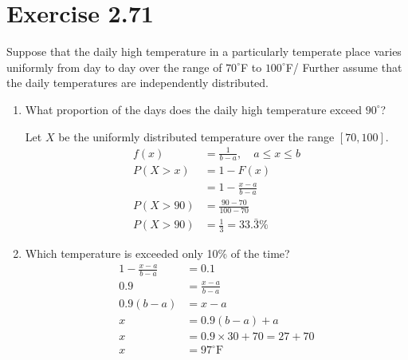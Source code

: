 \documentclass{article}
\begin{document}
\section*{Exercise 2.71}
Suppose that the daily high temperature in a particularly temperate place varies uniformly from day to day over the range of $70^\circ$F to $100^\circ$F/ Further assume that the daily temperatures are independently distributed.
\begin{enumerate}[\quad(a)]
	\item What proportion of the days does the daily high temperature exceed $90^\circ$?
	
	Let $X$ be the uniformly distributed temperature over the range $[70,100]$.
	\begin{align*}
		f(x) &= \frac{1}{b-a},\quad a\leq x \leq b\\
		P(X > x) &= 1- F(x)\\
		&= 1 - \frac{x-a}{b-a}\\
		P(X > 90) &= \frac{90-70}{100-70}\\
		P(X > 90) &= \frac{1}{3} = 33.\bar{3}\%
	\end{align*}
	\item Which temperature is exceeded only 10\% of the time?
	\begin{align*}
		1-\frac{x-a}{b-a} &= 0.1\\
		0.9 &= \frac{x-a}{b-a}\\
		0.9(b-a) &= x-a\\
		x &= 0.9(b-a) + a \\
		x &= 0.9\times 30 + 70 = 27+70\\
		x &= 97^\circ\text{F}
	\end{align*}
\end{enumerate}
\end{document}
